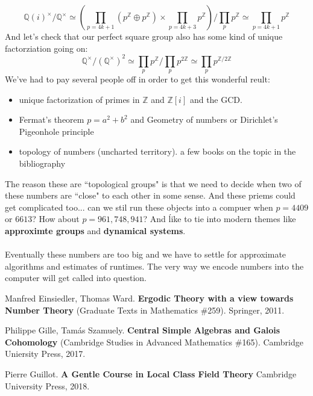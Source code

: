 \documentclass[12pt]{article}
\begin{document}
$$ \mathbb{Q}(i)^\times / \mathbb{Q}^\times \simeq 
\left( \prod_{p = 4k+1} (p^\mathbb{Z}\oplus p^\mathbb{Z}) \times \prod_{p = 4k+3} p^\mathbb{Z} \right) / \prod_p p^\mathbb{Z} \simeq \prod_{p = 4k+1} p^\mathbb{Z}$$
And let's check that our perfect square group also has some kind of unique factorziation going on:
$$ \mathbb{Q}^\times/(\mathbb{Q}^\times)^2 \simeq \prod_p p^\mathbb{Z} / \prod_p p^{2\mathbb{Z}} \simeq \prod_p p^{\mathbb{Z}/2\mathbb{Z}} $$
We've had to pay several people off in order to get this wonderful reult:
\begin{itemize}
\item unique factorization of primes in $\mathbb{Z}$ and $\mathbb{Z}[i]$ and the GCD.
\item Fermat's theorem $p = a^2 + b^2$ and Geometry of numbers or Dirichlet's Pigeonhole principle
\item topology of numbers (uncharted territory).  a few books on the topic in the bibliography
\end{itemize}
The reason these are ``topological groups" is that we need to decide when two of these numbers are ``close" to each other in some sense.  And these priems could get complicated too... can we stil run these objects into a compuer when $p = 4409$ or $6613$?  How about $p = 961,748,941$?  And ĺike to tie into modern themes like \textbf{approximte groups} and \textbf{dynamical systems}. \\ \\ Eventually these numbers are too big and we have to settle for approximate algorithms and estimates of runtimes.  The very way we encode numbers into the computer will get called into question.
\vfill
\begin{thebibliography}{} 

\item Manfred Einsiedler, Thomas Ward.  \textbf{Ergodic Theory with a view towards Number Theory} (Graduate Texts in Mathematics \#259).  Springer, 2011.

\item Philippe Gille, Tam\'{a}s Szamuely. \textbf{Central Simple Algebras and Galois Cohomology}  (Cambridge Studies in Advanced Mathematics \#165).  Cambridge Uniersity Press, 2017.


\item Pierre Guillot. \textbf{A Gentle Course in Local Class Field Theory} Cambridge University Press, 2018. 


\end{thebibliography}
\end{document}
